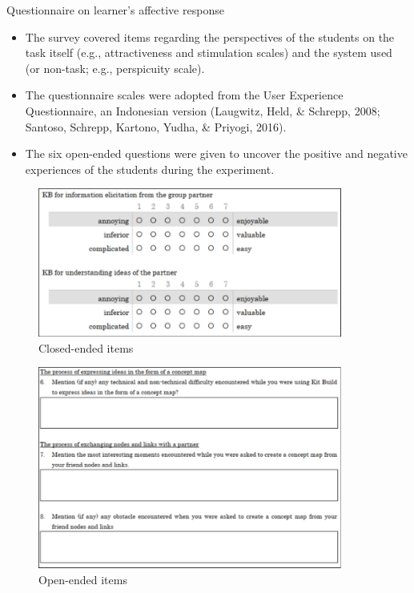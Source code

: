 \begin{frame}[allowframebreaks]{Questionnaire on learner's affective response}
    \begin{itemize}
        \item The survey covered items regarding the perspectives of 
              the students on the task itself (e.g., attractiveness 
              and stimulation scales) and the system used (or non-task; 
              e.g., perspicuity scale). 
        \item The questionnaire scales were adopted from the User Experience
              Questionnaire, an Indonesian version (Laugwitz, Held, \& Schrepp, 2008;
              Santoso, Schrepp, Kartono, Yudha, \& Priyogi, 2016). 
        \item The six open-ended questions were given to uncover the positive and
              negative experiences of the students during the experiment.
    \end{itemize}
    
    \begin{figure}[tb]
        \begin{center}
            \includegraphics[width=100mm]{images/rqa_questionnaire_closed_items.pdf}
        \end{center}
        \caption{Closed-ended items}
        \label{questionnaire_close}
    \end{figure}
    
    \begin{figure}[tb]
        \begin{center}
            \includegraphics[width=100mm]{images/rqa_questionnaire_open_items.pdf}
        \end{center}
        \caption{Open-ended items}
        \label{questionnaire_open}
    \end{figure}
\end{frame}

